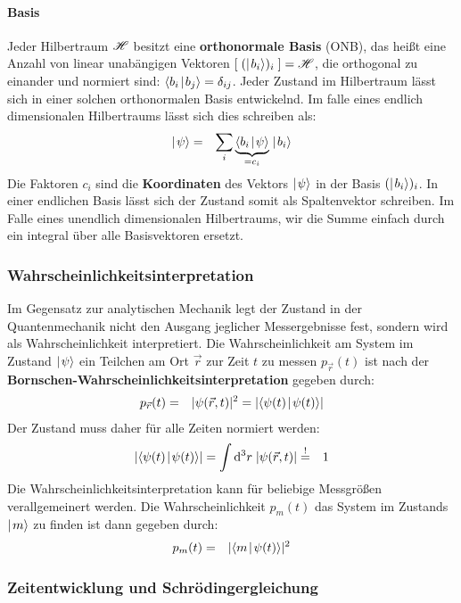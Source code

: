 \paragraph{Basis}
Jeder Hilbertraum $\mathscr H$ besitzt eine {\bf orthonormale Basis} (ONB), das heißt eine Anzahl von linear unabängigen Vektoren $[\;(\mid\!\!\!\,\,{b_i}\rangle)_i\;]=\mathscr H$, die orthogonal zu einander und normiert sind: $\langle{b_i}\!\!\!\,\,\mid\!\!\!\,\,{b_j}\rangle=\delta_{ij}$. Jeder Zustand im Hilbertraum lässt sich in einer solchen orthonormalen Basis entwickelnd. Im falle eines endlich dimensionalen Hilbertraums lässt sich dies schreiben als: 
\begin{eqnarray*}
	\ket{\psi} &=& \sum_{i} \underbrace{\braket{b_i}{\psi}}_{=c_i} \ket{b_i}
\end{eqnarray*}
Die Faktoren $c_i$ sind die {\bf Koordinaten} des Vektors $\mid\!\!\!\,\,{\psi}\rangle$ in der Basis $(\mid\!\!\!\,\,{b_i}\rangle)_i$. In einer endlichen Basis lässt sich der Zustand somit als Spaltenvektor schreiben. Im Falle eines unendlich dimensionalen Hilbertraums, wir die Summe einfach durch ein integral über alle Basisvektoren ersetzt. 

\subsubsection{Wahrscheinlichkeitsinterpretation}

Im Gegensatz zur analytischen Mechanik legt der Zustand in der Quantenmechanik nicht den Ausgang jeglicher Messergebnisse fest, sondern wird als Wahrscheinlichkeit interpretiert. Die Wahrscheinlichkeit am System im Zustand $\mid\!\!\!\,\,{\psi}\rangle$ ein Teilchen am Ort $\vec{r}$ zur Zeit $t$ zu messen $p_{\vec{r}}(t)$ ist nach der {\bf Bornschen-Wahrscheinlichkeitsinterpretation} gegeben durch: 
\begin{eqnarray*}
	p_{\vec{r}}(t) &=& |\psi(\vec{r},t)|^2 = |\langle{\psi(t)}\!\!\!\,\,\mid\!\!\!\,\,{\psi(t)}\rangle| 
\end{eqnarray*}
Der Zustand muss daher für alle Zeiten normiert werden: 
\begin{eqnarray*}
	|\langle{\psi(t)}\!\!\!\,\,\mid\!\!\!\,\,{\psi(t)}\rangle| = \int \mathrm{d}^3r\; |\psi(\vec{r},t)| &\overset{!}=& 1
\end{eqnarray*}
Die Wahrscheinlichkeitsinterpretation kann für beliebige Messgrößen verallgemeinert werden. Die Wahrscheinlichkeit $p_{m}(t)$ das System im Zustands $\mid\!\!\!\,\,{m}\rangle$ zu finden ist dann gegeben durch: 
\begin{eqnarray*}
	p_m(t) &=& |\langle{m}\!\!\!\,\,\mid\!\!\!\,\,{\psi(t)}\rangle|^2
\end{eqnarray*}

\subsubsection{Zeitentwicklung und Schrödingergleichung}

